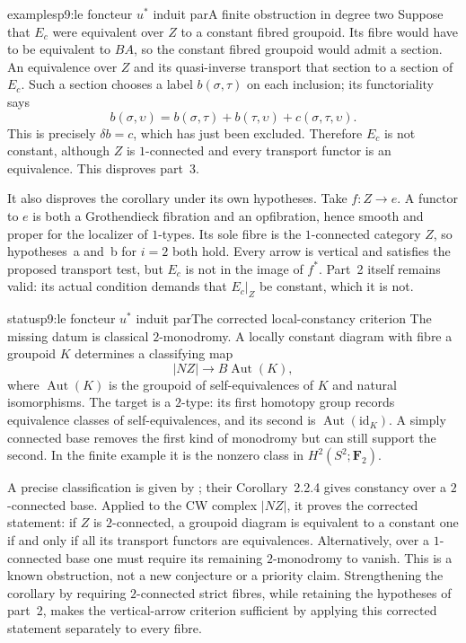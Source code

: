 \begin{dcomment}{examples}{p9:le foncteur $u^*$ induit par}{A finite obstruction in degree two}
Suppose that $E_c$ were equivalent over $Z$ to a constant fibred groupoid. Its fibre would have to be equivalent to $BA$, so the constant fibred groupoid would admit a section. An equivalence over $Z$ and its quasi-inverse transport that section to a section of $E_c$. Such a section chooses a label $b(\sigma,\tau)$ on each inclusion; its functoriality says
\[
 b(\sigma,\upsilon)
 =b(\sigma,\tau)+b(\tau,\upsilon)+c(\sigma,\tau,\upsilon).
\]
This is precisely $\delta b=c$, which has just been excluded. Therefore $E_c$ is not constant, although $Z$ is $1$-connected and every transport functor is an equivalence. This disproves part~3.

It also disproves the corollary under its own hypotheses. Take $f:Z\to e$. A functor to $e$ is both a Grothendieck fibration and an opfibration, hence smooth and proper for the localizer of $1$-types. Its sole fibre is the $1$-connected category $Z$, so hypotheses~a and~b for $i=2$ both hold. Every arrow is vertical and satisfies the proposed transport test, but $E_c$ is not in the image of $f^*$. Part~2 itself remains valid: its actual condition demands that $E_c|_Z$ be constant, which it is not.
\end{dcomment}

\begin{dcomment}{status}{p9:le foncteur $u^*$ induit par}{The corrected local-constancy criterion}
The missing datum is classical $2$-monodromy. A locally constant diagram with fibre a groupoid $K$ determines a classifying map
\[
 |NZ|\longrightarrow B\operatorname{Aut}(K),
\]
where $\operatorname{Aut}(K)$ is the groupoid of self-equivalences of $K$ and natural isomorphisms. The target is a $2$-type: its first homotopy group records equivalence classes of self-equivalences, and its second is $\operatorname{Aut}(\mathrm{id}_K)$. A simply connected base removes the first kind of monodromy but can still support the second. In the finite example it is the nonzero class in $H^2(S^2;\mathbf F_2)$.

A precise classification is given by \citet[arXiv version, Theorem~2.2.5 and \S2.3]{PoleselloWaschkies2005}; their Corollary~2.2.4 gives constancy over a $2$-connected base. Applied to the CW complex $|NZ|$, it proves the corrected statement: if $Z$ is $2$-connected, a groupoid diagram is equivalent to a constant one if and only if all its transport functors are equivalences. Alternatively, over a $1$-connected base one must require its remaining $2$-monodromy to vanish. This is a known obstruction, not a new conjecture or a priority claim. Strengthening the corollary by requiring $2$-connected strict fibres, while retaining the hypotheses of part~2, makes the vertical-arrow criterion sufficient by applying this corrected statement separately to every fibre.
\end{dcomment}


